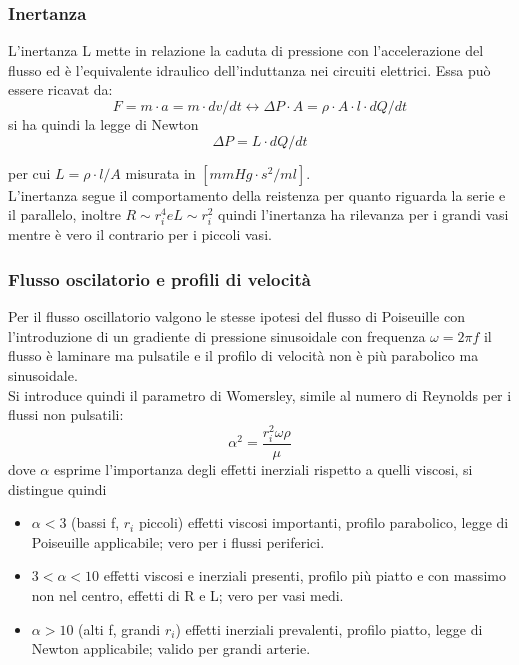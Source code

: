 \documentclass[10pt]{article}
\begin{document}
\subsubsection{Inertanza}
L'inertanza L mette in relazione la caduta di pressione con l'accelerazione del flusso ed è l'equivalente idraulico dell'induttanza nei circuiti elettrici. Essa può essere ricavat da:
\begin{equation}
    F=m \cdot a= m \cdot dv/dt \leftrightarrow \Delta P \cdot A =\rho \cdot A \cdot l \cdot dQ/dt
\end{equation}
si ha quindi la legge di Newton
\begin{equation}
    \Delta P= L \cdot dQ/dt
\end{equation}

per cui $L=\rho \cdot l/A$ misurata in $[mmHg \cdot s^2/ml]$.\\
L'inertanza segue il comportamento della reistenza per quanto riguarda la serie e il parallelo, inoltre $R \sim{r_i^4} e L \sim{r_i^2}$ quindi l'inertanza ha rilevanza per i grandi vasi mentre è vero il contrario per i piccoli vasi.

\subsubsection{Flusso oscilatorio e profili di velocità}

Per il flusso oscillatorio valgono le stesse ipotesi del flusso di Poiseuille con l'introduzione di un gradiente di pressione sinusoidale con frequenza $\omega=2 \pi f$ \textrightarrow il flusso è laminare ma pulsatile e il profilo di velocità non è più parabolico ma sinusoidale.\\
Si introduce quindi il parametro di Womersley, simile al numero di Reynolds per i flussi non pulsatili:
\begin{equation}
    \alpha^2=\frac{r_i^2 \omega \rho}{\mu}
\end{equation}
dove $\alpha$ esprime l'importanza degli effetti inerziali rispetto a quelli viscosi, si distingue quindi
\begin{itemize}
    \item $\alpha< 3$ (bassi f, $r_i$ piccoli) \textrightarrow effetti viscosi importanti, profilo parabolico, legge di Poiseuille applicabile; vero per i flussi periferici.
    \item $3<\alpha<10$ \textrightarrow effetti viscosi e inerziali presenti, profilo più piatto e con massimo non nel centro, effetti di R e L; vero per vasi medi.
    \item $\alpha>10$ (alti f, grandi $r_i$) \textrightarrow effetti inerziali prevalenti, profilo piatto, legge di Newton applicabile; valido per grandi arterie.
\end{itemize}
\end{document}
